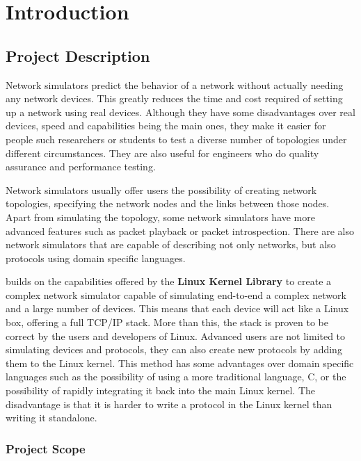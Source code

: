 \chapter{Introduction}
\label{chapter:intro}

\section{Project Description}
\label{sec:proj}

Network simulators predict the behavior of a network without actually needing any network devices.
This greatly reduces the time and cost required of setting up a network using real devices. Although
they have some disadvantages over real devices, speed and capabilities being the main ones, they
make it easier for people such researchers or students to test a diverse number of topologies under
different circumstances. They are also useful for engineers who do quality assurance and performance
testing.

Network simulators usually offer users the possibility of creating network topologies, specifying the
network nodes and the links between those nodes. Apart from simulating the topology, some network
simulators have more advanced features such as packet playback or packet introspection.
There are also network simulators that are capable of describing not only networks, but also protocols
using domain specific languages.

\textbf{\project} builds on the capabilities offered by the \textbf{Linux Kernel Library} to create
a complex network simulator capable of simulating end-to-end a complex network and a large number
of devices. This means that each device will act like a Linux box, offering a full TCP/IP stack.
More than this, the stack is proven to be correct by the users and developers of Linux. Advanced
users are not limited to simulating devices and protocols, they can also create new protocols by
adding them to the Linux kernel. This method has some advantages over domain specific languages such
as the possibility of using a more traditional language, C, or the possibility of rapidly integrating
it back into the main Linux kernel. The disadvantage is that it is harder to write a protocol
in the Linux kernel than writing it standalone.

\subsection{Project Scope}
\label{sub-sec:proj-scope}

